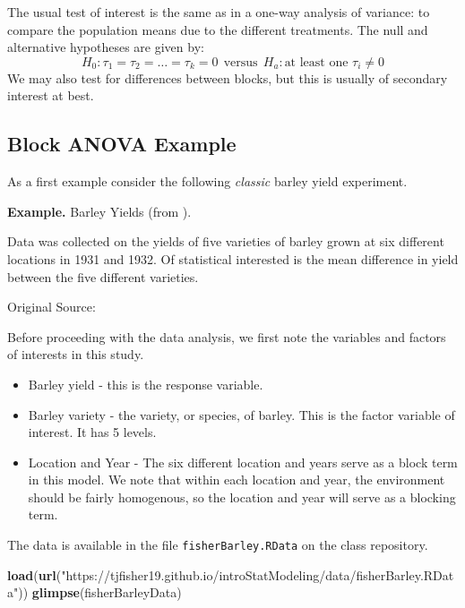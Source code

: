 \documentclass[
]{book}
\newenvironment{Shaded}{\begin{snugshade}}{\end{snugshade}}
\newcommand{\FunctionTok}[1]{\textcolor[rgb]{0.13,0.29,0.53}{\textbf{#1}}}
\newcommand{\NormalTok}[1]{#1}
\newcommand{\StringTok}[1]{\textcolor[rgb]{0.31,0.60,0.02}{#1}}
\providecommand{\tightlist}{%
  \setlength{\itemsep}{0pt}\setlength{\parskip}{0pt}}
\begin{document}
The usual test of interest is the same as in a one-way analysis of variance: to compare the population means due to the different treatments.
The null and alternative hypotheses are given by:
\[H_0: \tau_1 = \tau_2 = \ldots = \tau_k = 0 ~~\textrm{versus}~~ H_a: \textrm{at least one } \tau_i \neq 0\]
We may also test for differences between blocks, but this is usually of secondary interest at best.

\hypertarget{block-anova-example}{%
\subsection{Block ANOVA Example}\label{block-anova-example}}

As a first example consider the following \emph{classic} barley yield experiment.

\textbf{Example.} Barley Yields (from \citet{Fisher1935}).

Data was collected on the yields of five varieties of barley grown at six different locations in 1931 and 1932.
Of statistical interested is the mean difference in yield between the five different varieties.

Original Source: \citet{ImmerHayesPowers1934}

Before proceeding with the data analysis, we first note the variables and factors of interests in this study.

\begin{itemize}
\tightlist
\item
  Barley yield - this is the response variable.
\item
  Barley variety - the variety, or species, of barley. This is the factor variable of interest. It has 5 levels.
\item
  Location and Year - The six different location and years serve as a block term in this model. We note that within each location and year, the environment should be fairly homogenous, so the location and year will serve as a blocking term.
\end{itemize}

The data is available in the file \texttt{fisherBarley.RData} on the class repository.

\begin{Shaded}
\begin{Highlighting}[]
\FunctionTok{load}\NormalTok{(}\FunctionTok{url}\NormalTok{(}\StringTok{"https://tjfisher19.github.io/introStatModeling/data/fisherBarley.RData"}\NormalTok{))}
\FunctionTok{glimpse}\NormalTok{(fisherBarleyData)}
\end{Highlighting}
\end{Shaded}
\end{document}
